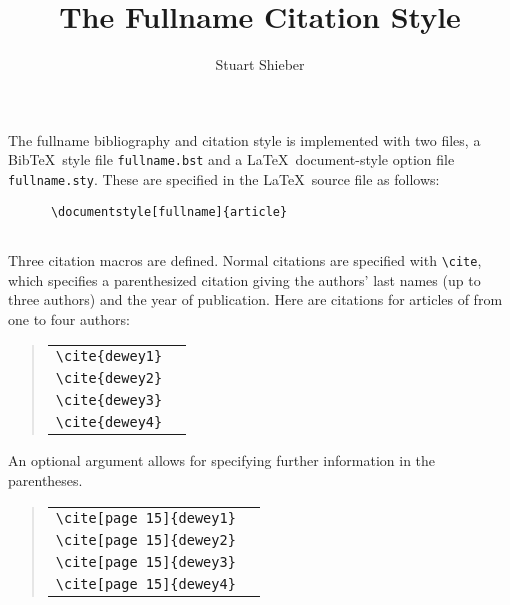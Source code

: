 
\addtolength{\textwidth}{40pt}
\addtolength{\oddsidemargin}{-20pt}

\title{The Fullname Citation Style}
\author{Stuart Shieber}



\maketitle

The fullname bibliography and citation style is implemented with two files, a
Bib\TeX\ style file {\tt fullname.bst} and a \LaTeX\ document-style
option file {\tt fullname.sty}.  These are specified in the 
\LaTeX\ source file as follows:

\begin{verbatim}
      \documentstyle[fullname]{article}
      
\end{verbatim}

Three citation macros are defined.  Normal citations are specified
with \verb|\cite|, which specifies a parenthesized citation giving the
authors' last names (up to three authors) and the year of publication.
Here are citations for articles of from one to four authors: 

\begin{verse}\begin{tabular}{ll}
\verb|\cite{dewey1}| & \cite{dewey1}\\
\verb|\cite{dewey2}| & \cite{dewey2}\\
\verb|\cite{dewey3}| & \cite{dewey3}\\
\verb|\cite{dewey4}| & \cite{dewey4}
\end{tabular}\end{verse}

An optional argument allows for specifying further information in the
parentheses.

\begin{verse}\begin{tabular}{ll}
\verb|\cite[page 15]{dewey1}| & \cite[page 15]{dewey1}\\
\verb|\cite[page 15]{dewey2}| & \cite[page 15]{dewey2}\\
\verb|\cite[page 15]{dewey3}| & \cite[page 15]{dewey3}\\
\verb|\cite[page 15]{dewey4}| & \cite[page 15]{dewey4}
\end{tabular}\end{verse}

